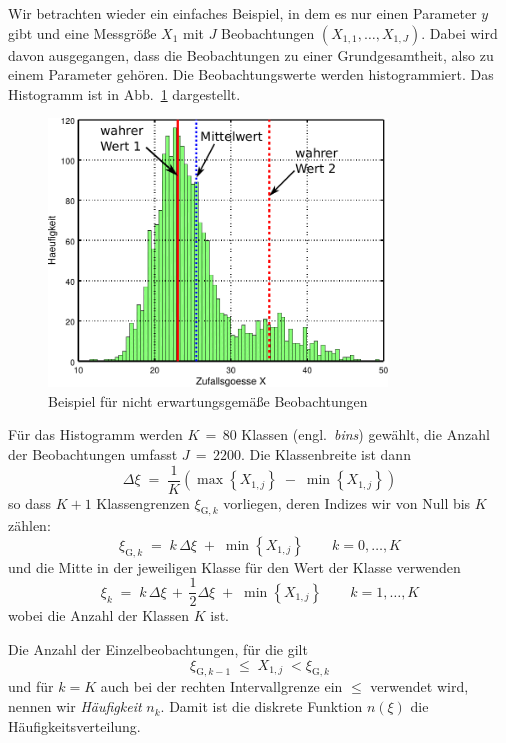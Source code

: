 Wir betrachten wieder ein einfaches Beispiel, in dem es nur einen Parameter $y$ gibt und eine 
Messgröße $X_1$ mit $J$ Beobachtungen $(X_{1,1},\dots,X_{1,J})$.
Dabei wird davon ausgegangen, dass die Beobachtungen zu einer Grundgesamtheit, also zu einem Parameter gehören.
Die Beobachtungswerte werden histogrammiert. Das Histogramm ist in Abb.~\ref{biasExample} dargestellt.
\begin{figure}
\begin{center}
\includegraphics[width=90mm]{03_vorlesung/media/learn_robust.pdf}
\caption{Beispiel für nicht erwartungsgemäße Beobachtungen}
\label{biasExample}
\end{center}
\end{figure}
Für das Histogramm werden $K \, = \, 80$ Klassen (engl.\ \textsl{bins}) gewählt, die Anzahl der Beobachtungen umfasst $J \, = \, 2200$.
Die Klassenbreite ist dann
\begin{equation}
\Delta \xi \; = \; \frac{1}{K} \left( \max \left\{X_{1,j}\right\} \; - \; \min \left\{X_{1,j}\right\} \right)
\end{equation}
so dass $K+1$ Klassengrenzen $\xi_{\mathrm{G}, k}$ vorliegen,
deren Indizes wir von Null bis $K$ zählen:
\begin{equation}
 \xi_{\mathrm{G}, k} \; = \; k \, \Delta \xi \; + \; \min \left\{X_{1,j}\right\}
\qquad k = 0, \dots, K
\label{limkthbin}
\end{equation}
und die Mitte in der jeweiligen Klasse für den Wert der Klasse verwenden
\begin{equation}
 \xi_k \; = \; k \, \Delta \xi  \, + \, \frac{1}{2} \Delta \xi  \; + \; \min \left\{X_{1,j}\right\}
\qquad k = 1, \dots, K
\label{kthbin}
\end{equation}
wobei die Anzahl der Klassen $K$ ist.

Die Anzahl der Einzelbeobachtungen, für die gilt
\begin{equation}
\xi_{\mathrm{G}, k-1} \; \leq \; X_{1,j} \; <  \xi_{\mathrm{G}, k}
\end{equation}
und für $k = K$ auch bei der rechten Intervallgrenze ein $\leq$ verwendet wird, nennen
wir \textsl{Häufigkeit} $n_k$. Damit ist die diskrete Funktion $n(\xi)$ die Häufigkeitsverteilung.

